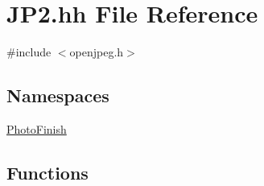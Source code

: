 \hypertarget{_j_p2_8hh}{}\section{J\+P2.\+hh File Reference}
\label{_j_p2_8hh}
{\ttfamily \#include $<$openjpeg.\+h$>$}\newline
\subsection*{Namespaces}
\begin{DoxyCompactItemize}
\item 
 \hyperlink{namespace_photo_finish}{Photo\+Finish}
\end{DoxyCompactItemize}
\subsection*{Functions}
